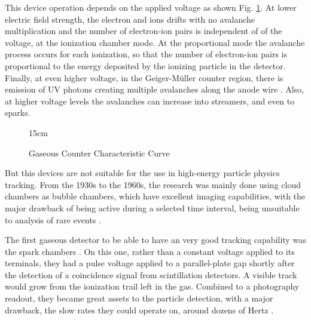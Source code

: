 This device operation depends on the applied voltage as shown Fig. \ref{fig:gaseous_curve}. At lower electric field strength, the electron and ions drifts with no avalanche multiplication and the number of electron-ion pairs is independent of of the voltage, at the ionization chamber mode. At the proportional mode the avalanche process occurs for each ionization, so that the number of electron-ion pairs is proportional to the energy deposited by the ionizing particle in the detector. Finally, at even higher voltage, in the Geiger-Müller counter region, there is emission of UV photons creating multiple avalanches along the anode wire \cite{o1961detection}. Also, at higher voltage levels the avalanches can increase into streamers, and even to sparks.

\begin{figure}[!htm]{15cm} 
\caption{Gaseous Counter Characteristic Curve}%
\label{fig:gaseous_curve}
\end{figure}

But this devices are not suitable for the use in high-energy particle physics tracking. From the 1930s to the 1960s, the research was mainly done using cloud chambers as bubble chambers, which have excellent imaging capabilities, with the major drawback of being active during a selected time interval, being unsuitable to analysis of rare events \cite{sauli2015gaseous}.

The first gaseous detector to be able to have an very good tracking capability was the spark chambers \cite{fukui1959new}. On this one, rather than a constant voltage applied to its terminals, they had a pulse voltage applied to a parallel-plate gap shortly after the detection of a coincidence signal from scintillation detectors. A visible track would grow from the ionization trail left in the gas. Combined to a photography readout, they became great assets to the particle detection, with a major drawback, the slow rates they could operate on, around dozens of Hertz \cite{sauli2015gaseous}.

